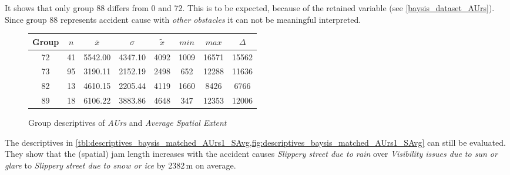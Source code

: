 It shows that only group 88 differs from 0 and 72. This is to be expected, because of the retained variable (see \cref{baysis_dataset_AUrs}). Since group 88 represents accident cause with \textit{other obstacles} it can not be meaningful interpreted. 
\begin{figure}[ht!]
	\centering
	\begin{minipage}{0.5\textwidth}
		\tiny
		\setlength{\tabcolsep}{4pt}
		\centering
		\begin{tabular}{c|c|c|c|c|c|c|c}
			\toprule
			Group & $n$ & $\bar{x}$ & $\sigma$ & $\tilde{x}$ & $min$ & $max$ & $\Delta$ \\
			\midrule
			72 & 41 & 5542.00 & 4347.10 & 4092 & 1009 & 16571 & 15562 \\ 
			73 & 95 & 3190.11 & 2152.19 & 2498 & 652  & 12288 & 11636 \\ 
			82 & 13 & 4610.15 & 2205.44 & 4119 & 1660 & 8426  & 6766  \\  
			89 & 18 & 6106.22 & 3883.86 & 4648 & 347  & 12353 & 12006 \\ 
			\bottomrule
		\end{tabular}
		\label{tbl:descriptives_baysis_matched_AUrs1_SAvg}
	\end{minipage}%
	\begin{minipage}{0.55\textwidth}
		\data 
        \pgfplotstablesort[sort key=mean, sort cmp=float >]{\datasorted}{\data}
        \tiny
        \centering
		\label{fig:descriptives_baysis_matched_AUrs1_SAvg}
	\end{minipage}%
	\caption{Group descriptives of \textit{AUrs} and \textit{Average Spatial Extent}}
\end{figure}
The descriptives in \cref{tbl:descriptives_baysis_matched_AUrs1_SAvg,fig:descriptives_baysis_matched_AUrs1_SAvg} can still be evaluated. They show that the (spatial) jam length increases with the accident causes \textit{Slippery street due to rain} over \textit{Visibility issues due to sun or glare} to \textit{Slippery street due to snow or ice} by 2382\,m on average.

